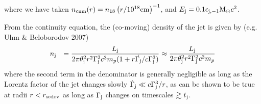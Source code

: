 \documentclass[usenatbib,fleqn]{mnras}
\newcommand{\Msun}{{\rm M_\odot}}
\begin{document}
where we have taken $n_{\rm cnm} (r)=n_{18} \left(r/10^{18} {\rm
    cm}\right)^{-1}$, and $E_{\rm j}=0.1 \epsilon_{\rm j,-1} \Msun
c^2$.

From the continuity equation, the (co-moving) density of the jet is
given by (e.g. Uhm \& Beloborodov 2007)
 \begin{eqnarray}
   &n_{\rm j}& =  \frac{L_{\rm j}}{2\pi \theta_{\rm j}^{2}r^{2}\Gamma_{\rm j}^{2}c^{3}m_p(1 + r \dot{\Gamma_{\rm j}}/c\Gamma_{\rm j}^{3})} \approx  \frac{L_{\rm j}}{2\pi \theta_{\rm j}^{2}r^{2}\Gamma_{\rm j}^{2}c^{3}m_p}
\end{eqnarray}
where the second term in the denominator is generally negligible as
long as the Lorentz factor of the jet changes slowly
$\dot{\Gamma}_{\rm j} \ll c\Gamma_{\rm j}^{3}/r$, as can be shown to
be true at radii $r < r_{\rm sedov}$ as long as $\Gamma_{\rm j}$
changes on timescales $\gtrsim t_{\rm j}$.
\end{document}
